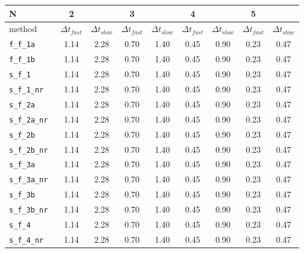 \begin{tabular}{l|cc|cc|cc|cc}
N& 2  &  & 3  &  & 4  &  & 5  &  \\
\hline
method& $\Delta t_{fast}$  & $\Delta t_{slow}$& $\Delta t_{fast}$  & $\Delta t_{slow}$& $\Delta t_{fast}$  & $\Delta t_{slow}$& $\Delta t_{fast}$  & $\Delta t_{slow}$\\
\hline
\verb|f_f_1a | & 1.14 & 2.28 & 0.70 & 1.40 & 0.45 & 0.90 & 0.23 & 0.47 \\
\verb|f_f_1b | & 1.14 & 2.28 & 0.70 & 1.40 & 0.45 & 0.90 & 0.23 & 0.47 \\
\verb|s_f_1 | & 1.14 & 2.28 & 0.70 & 1.40 & 0.45 & 0.90 & 0.23 & 0.47 \\
\verb|s_f_1_nr | & 1.14 & 2.28 & 0.70 & 1.40 & 0.45 & 0.90 & 0.23 & 0.47 \\
\verb|s_f_2a | & 1.14 & 2.28 & 0.70 & 1.40 & 0.45 & 0.90 & 0.23 & 0.47 \\
\verb|s_f_2a_nr | & 1.14 & 2.28 & 0.70 & 1.40 & 0.45 & 0.90 & 0.23 & 0.47 \\
\verb|s_f_2b | & 1.14 & 2.28 & 0.70 & 1.40 & 0.45 & 0.90 & 0.23 & 0.47 \\
\verb|s_f_2b_nr | & 1.14 & 2.28 & 0.70 & 1.40 & 0.45 & 0.90 & 0.23 & 0.47 \\
\verb|s_f_3a | & 1.14 & 2.28 & 0.70 & 1.40 & 0.45 & 0.90 & 0.23 & 0.47 \\
\verb|s_f_3a_nr | & 1.14 & 2.28 & 0.70 & 1.40 & 0.45 & 0.90 & 0.23 & 0.47 \\
\verb|s_f_3b | & 1.14 & 2.28 & 0.70 & 1.40 & 0.45 & 0.90 & 0.23 & 0.47 \\
\verb|s_f_3b_nr | & 1.14 & 2.28 & 0.70 & 1.40 & 0.45 & 0.90 & 0.23 & 0.47 \\
\verb|s_f_4 | & 1.14 & 2.28 & 0.70 & 1.40 & 0.45 & 0.90 & 0.23 & 0.47 \\
\verb|s_f_4_nr | & 1.14 & 2.28 & 0.70 & 1.40 & 0.45 & 0.90 & 0.23 & 0.47 \\
\hline
\end{tabular}

